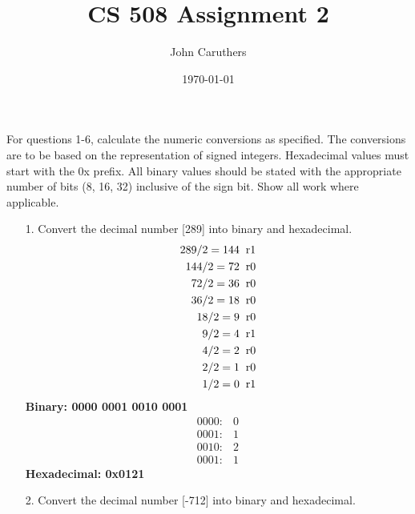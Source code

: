 \documentclass{article}
\title{CS 508 Assignment 2}
\author{John Caruthers}
\date\today
\begin{document}
\maketitle

For questions 1-6, calculate the numeric conversions as specified.  The conversions are to be based on the representation of signed integers.  Hexadecimal values must start with the 0x prefix.  All binary values should be stated with the appropriate number of bits (8, 16, 32) inclusive of the sign bit.  Show all work where applicable. 

\begin{itemize}
    \item[1.] Convert the decimal number [289] into binary and hexadecimal.
    \begin{align}
        289/2=144 \hspace{0.2cm}&\text{r}1 \nonumber\\
        144/2=72 \hspace{0.2cm}&\text{r}0 \nonumber\\
        72/2=36 \hspace{0.2cm}&\text{r}0 \nonumber\\
        36/2=18 \hspace{0.2cm}&\text{r}0 \nonumber\\
        18/2=9 \hspace{0.2cm}&\text{r}0 \nonumber\\
        9/2=4 \hspace{0.2cm}&\text{r}1 \nonumber\\
        4/2=2 \hspace{0.2cm}&\text{r}0 \nonumber\\
        2/2=1 \hspace{0.2cm}&\text{r}0 \nonumber\\
        1/2=0 \hspace{0.2cm}&\text{r}1 \nonumber
    \end{align}
    \textbf{Binary: 0000 0001 0010 0001}
    \begin{align}
        0000: &0\nonumber\\
        0001: &1\nonumber\\
        0010: &2\nonumber\\
        0001: &1\nonumber
    \end{align}
    \textbf{Hexadecimal: 0x0121}
    \item[2.] Convert the decimal number [-712] into binary and hexadecimal.
    \begin{align}

\end{align}
\end{itemize}
\end{document}

